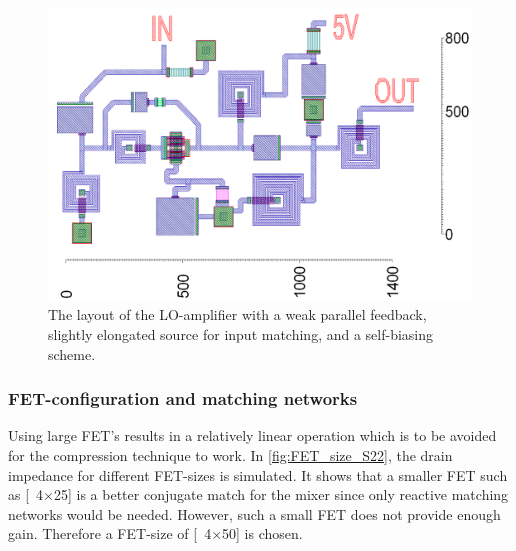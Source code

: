 			\begin{figure}[hbt!]
				\centering
				\includegraphics[width=1.0\textwidth]{fig/amplifiers/lo/layout}
				\caption[LO-amplifier layout]{The layout of the LO-amplifier with a weak parallel feedback, slightly elongated source for input matching, and a self-biasing scheme.\scalemum}\label{fig:lo_layout}
			\end{figure}



		\subsubsection{FET-configuration and matching networks}\label{sec:lo_fet_config}
			Using large FET's results in a relatively linear operation which is to be avoided for the compression technique to work.\autocite{maas98} In \autoref{fig:FET_size_S22}, the drain impedance for different FET-sizes is simulated. It shows that a smaller FET such as \unit[4$\times$25]{\mum} is a better conjugate match for the mixer since only reactive matching networks would be needed. However, such a small FET does not provide enough gain. Therefore a FET-size of \unit[4$\times$50]{\mum} is chosen.

